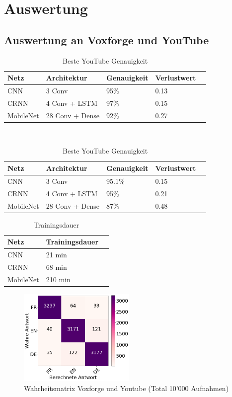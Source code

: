 \section{Auswertung}

\subsection{Auswertung an Voxforge und YouTube}

\begin{table}[h]
	\centering
	\begin{tabular}{lllll}
		\hline
		Netz & Architektur     & Genauigkeit & Verlustwert & \\ \hline
		CNN  & 3 Conv          & 95\%     & 0.13  \\
		CRNN & 4 Conv + LSTM   & 97\%     & 0.15  \\
		MobileNet  & 28 Conv + Dense & 92\%     & 0.27  \\ \hline
	\end{tabular} \\
	\caption{Beste Voxforge Genauigkeit}
	\label{table:test_vox}
	\vspace{0.3cm}
	\begin{tabular}{lllll}
		\hline
		Netz & Architektur     & Genauigkeit & Verlustwert & \\ \hline
		CNN  & 3 Conv          & 95.1\%     & 0.15  \\
		CRNN & 4 Conv + LSTM   & 95\%     & 0.21  \\
		MobileNet  & 28 Conv + Dense & 87\%     & 0.48  \\ \hline
	\end{tabular}
	\caption{Beste YouTube Genauigkeit}
	\label{table:test_you}
\end{table}

\begin{table}[h]
	\centering
	\begin{tabular}{lll}
		\hline
		Netz & Trainingsdauer \\ \hline
		CNN  & 21 min \\
		CRNN & 68 min \\
		MobileNet  & 210 min\\ \hline
	\end{tabular}
	\caption{Trainingsdauer}
	\label{table:test}
\end{table}

 \begin{figure}[hbt]
	\centering
		\includegraphics[width=0.5\textwidth]{assets/matrix_vox.png}
	\caption{Wahrheitsmatrix Voxforge und Youtube (Total 10'000 Aufnahmen)}
	\label{img:matrix_vox}
\end{figure}

